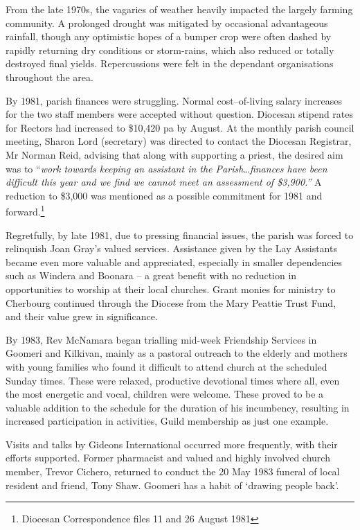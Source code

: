 From the late 1970s, the vagaries of weather heavily impacted the largely farming community. A prolonged drought was mitigated by occasional advantageous rainfall, though any optimistic hopes of a bumper crop were often dashed by rapidly returning dry conditions or storm-rains, which also reduced or totally destroyed final yields. Repercussions were felt in the dependant organisations throughout the area.



By 1981, parish finances were struggling. Normal cost--of-living salary increases for the two staff members were accepted without question. Diocesan stipend rates for Rectors had increased to \$10,420 pa by August. At the monthly parish council meeting, Sharon Lord (secretary) was directed to contact the Diocesan Registrar, Mr Norman Reid, advising that along with supporting a priest, the desired aim was to ``\emph{work towards keeping an assistant in the Parish\ldots finances have been difficult this year and we find we cannot meet an assessment of \$3,900.''} A reduction to \$3,000 was mentioned as a possible commitment for 1981 and forward.\footnote{Diocesan Correspondence files 11 and 26 August 1981}


Regretfully, by late 1981, due to pressing financial issues, the parish was forced to relinquish Joan Gray's valued services. Assistance given by the Lay Assistants became even more valuable and appreciated, especially in smaller dependencies such as Windera and Boonara -- a great benefit with no reduction in opportunities to worship at their local churches. Grant monies for ministry to Cherbourg continued through the Diocese from the Mary Peattie Trust Fund, and their value grew in significance.



By 1983, Rev McNamara began trialling mid-week Friendship Services in Goomeri and Kilkivan, mainly as a pastoral outreach to the elderly and mothers with young families who found it difficult to attend church at the scheduled Sunday times. These were relaxed, productive devotional times where all, even the most energetic and vocal, children were welcome. These proved to be a valuable addition to the schedule for the duration of his incumbency, resulting in increased participation in activities, Guild membership as just one example.



Visits and talks by Gideons International occurred more frequently, with their efforts supported. Former pharmacist and valued and highly involved church member, Trevor Cichero, returned to conduct the 20 May 1983 funeral of local resident and friend, Tony Shaw. Goomeri has a habit of `drawing people back'.



